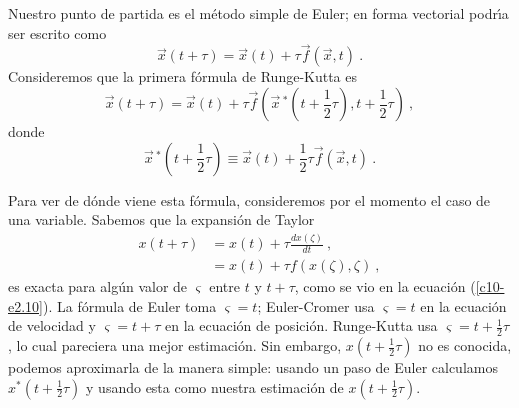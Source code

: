 Nuestro punto de partida es el m{\'e}todo simple de Euler; en forma
vectorial podr{\'\i}a ser escrito como
\begin{equation}
\label{c11-e3.18}
\vec x(t+\tau)=\vec x(t)+\tau \vec f(\vec x,t)\ .
\end{equation}
Consideremos que la primera f{\'o}rmula de Runge-Kutta es
\begin{equation}
\label{c11-e3.19}
\vec x(t+\tau)=\vec x(t)+\tau \vec f\left (\vec x\,^*\left (t+\frac
    12\tau\right ),  t+\frac 12\tau\right )\ ,
\end{equation}
donde
\begin{equation}
\label{c11-e3.20}
\vec x\,^*\left (t+\frac 12\tau\right )\equiv \vec x(t)+\frac 12\tau \vec f(\vec x, t)\ .
\end{equation}

Para ver de d{\'o}nde viene esta f{\'o}rmula, consideremos por el momento el
caso de una variable. Sabemos que la expansi{\'o}n de Taylor
\begin{equation}
\label{c11-e3.21}
\begin{split}
x(t+\tau) &= x(t)+\tau \frac{dx(\zeta)}{dt}\ ,\\
&= x(t)+\tau f(x(\zeta),\zeta)\ ,
\end{split}
\end{equation}
es exacta para alg{\'u}n valor de $\varsigma$ entre $t$ y $t+\tau$, como se vio en la
ecuaci{\'o}n (\ref{c10-e2.10}). La f{\'o}rmula de Euler toma $\varsigma=t$;
Euler-Cromer usa $\varsigma=t$ en la ecuaci{\'o}n de velocidad y $\varsigma=t+\tau$ en la
ecuaci{\'o}n de posici{\'o}n. Runge-Kutta usa $\varsigma=t+\frac 12 \tau$, lo cual
pareciera una mejor estimaci{\'o}n. Sin embargo, $x\left (t+\frac 12
  \tau\right)$ no es conocida, podemos aproximarla de la manera simple:
usando un paso de Euler calculamos $x^*\left(t+\frac 12 \tau\right)$ y
usando esta como nuestra estimaci{\'o}n de $x\left(t+\frac 12 \tau\right)$.

\vspace{.2cm}


